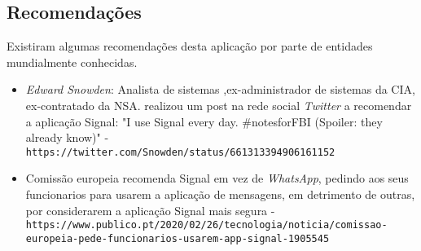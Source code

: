 \subsection{Recomendações}
\label{sec:recomendacoes}
Existiram algumas recomendações desta aplicação por parte de entidades mundialmente conhecidas.
\begin{itemize}
    \item \textit{Edward Snowden}: Analista de sistemas ,ex-administrador de sistemas da CIA, ex-contratado da NSA. realizou um post na rede social \textit{Twitter} a recomendar a aplicação Signal: "I use Signal every day. #notesforFBI (Spoiler: they already know)" -  \nolinkurl{https://twitter.com/Snowden/status/661313394906161152}
    \item Comissão europeia recomenda Signal em vez de \textit{WhatsApp}, pedindo aos seus funcionarios para usarem a aplicação de mensagens, em detrimento de outras, por considerarem a aplicação Signal mais segura - \nolinkurl{https://www.publico.pt/2020/02/26/tecnologia/noticia/comissao-europeia-pede-funcionarios-usarem-app-signal-1905545}
\end{itemize}






